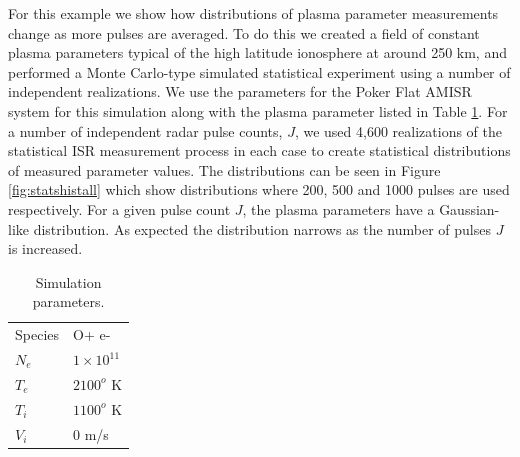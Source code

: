 \documentclass[draft,ras]{agutex}
\newcommand{\pcom}[2]{\marginpar{{\footnotesize \bf #1}}{\it {#2}}}
\begin{document}
\begin{article}
For this example we show how distributions of plasma parameter measurements change as more pulses are averaged. To do this we created a field of constant plasma parameters typical of the high latitude ionosphere at around 250 km, and performed a Monte Carlo-type simulated statistical experiment using a number of independent realizations. We use the parameters for the Poker Flat AMISR system for this simulation along with the plasma parameter listed in Table \ref{tb:param1}. For a number of independent radar pulse counts, $J$, we used 4,600 realizations of the statistical ISR measurement process in each case to create statistical distributions of measured parameter values. The distributions can be seen in Figure \ref{fig:statshistall} which show distributions where 200, 500 and 1000 pulses are used respectively. For a given pulse count $J$, the plasma parameters have a Gaussian-like distribution. As expected the distribution narrows as the number of pulses $J$ is increased.  

\begin{table}[!t]
\centering
\caption{Simulation parameters.}
\label{tb:param1}
\begin{tabular}{ll}
Species & O+ e-\\
$N_e$    & $1\times 10^{11}$ \\
$T_e$      & $2100^o$ K   \\
$T_i$      & $1100^o$ K \\
$V_i$      & $0$ m/s
\end{tabular}
\end{table}


\end{article}
\end{document}
